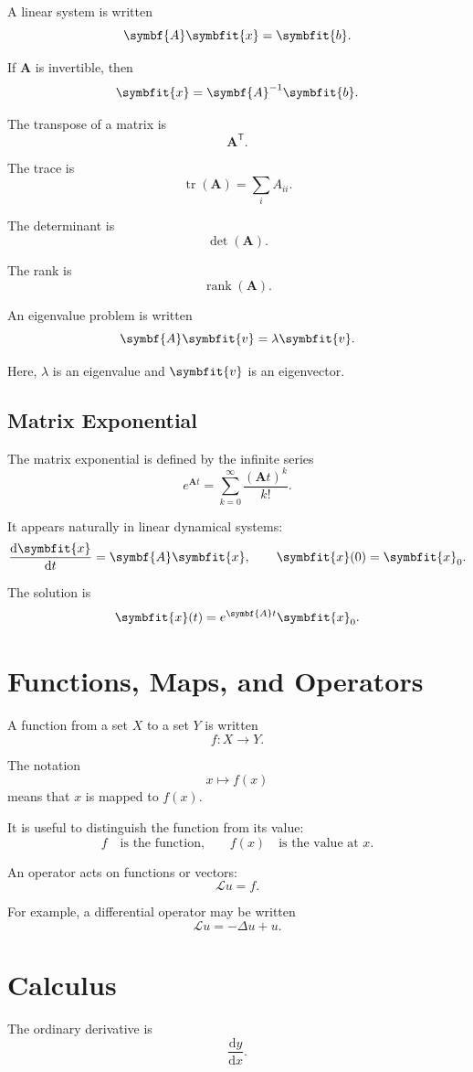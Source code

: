 \documentclass[11pt,twocolumn]{article}
\newcommand{\vct}[1]{\symbfit{#1}}   %
\newcommand{\mat}[1]{\symbf{#1}}     %
\newcommand{\T}{^{\mathsf{T}}}
\newcommand{\tr}{\operatorname{tr}}
\newcommand{\rank}{\operatorname{rank}}
\newcommand{\determinant}{\operatorname{det}}
\newcommand{\dv}[2]{\frac{\mathrm{d} #1}{\mathrm{d} #2}}
\begin{document}
A linear system is written
\[
\mat{A}\vct{x}=\vct{b}.
\]

If \(\mat{A}\) is invertible, then
\[
\vct{x}=\mat{A}^{-1}\vct{b}.
\]

The transpose of a matrix is
\[
\mat{A}\T.
\]

The trace is
\[
\tr(\mat{A})
=
\sum_i A_{ii}.
\]

The determinant is
\[
\determinant(\mat{A}).
\]

The rank is
\[
\rank(\mat{A}).
\]

An eigenvalue problem is written
\[
\mat{A}\vct{v}
=
\lambda \vct{v}.
\]

Here, \(\lambda\) is an eigenvalue and \(\vct{v}\) is an eigenvector.

\subsection{Matrix Exponential}

The matrix exponential is defined by the infinite series
\[
e^{\mat{A}t}
=
\sum_{k=0}^{\infty}
\frac{(\mat{A}t)^k}{k!}.
\]

It appears naturally in linear dynamical systems:
\[
\dv{\vct{x}}{t}
=
\mat{A}\vct{x},
\qquad
\vct{x}(0)=\vct{x}_0.
\]

The solution is
\[
\vct{x}(t)
=
e^{\mat{A}t}\vct{x}_0.
\]

\section{Functions, Maps, and Operators}

A function from a set \(X\) to a set \(Y\) is written
\[
f:X\to Y.
\]

The notation
\[
x \mapsto f(x)
\]
means that \(x\) is mapped to \(f(x)\).

It is useful to distinguish the function from its value:
\[
f
\quad
\text{is the function,}
\qquad
f(x)
\quad
\text{is the value at }x.
\]

An operator acts on functions or vectors:
\[
\mathcal{L}u=f.
\]

For example, a differential operator may be written
\[
\mathcal{L}u
=
-\Delta u + u.
\]

\section{Calculus}

The ordinary derivative is
\[
\dv{y}{x}.
\]
\end{document}
